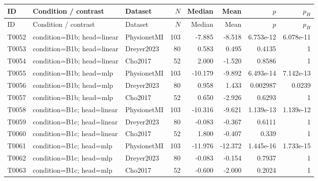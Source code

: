 \begin{longtable}{p{.45in}p{2.6in}p{.75in}rrrrr}
\toprule
ID & Condition / contrast & Dataset & $N$ & Median & Mean & $p$ & $p_H$ \\
\midrule
\endfirsthead
\toprule
ID & Condition / contrast & Dataset & $N$ & Median & Mean & $p$ & $p_H$ \\
\midrule
\endhead
T0052 & condition=B1b; head=linear & PhysionetMI & 103 & -7.885 & -8.518 & 6.753e-12 & 6.078e-11 \\
T0053 & condition=B1b; head=linear & Dreyer2023 & 80 & 0.583 & 0.495 & 0.4135 & 1 \\
T0054 & condition=B1b; head=linear & Cho2017 & 52 & 2.000 & -1.520 & 0.8586 & 1 \\
T0055 & condition=B1b; head=mlp & PhysionetMI & 103 & -10.179 & -9.892 & 6.493e-14 & 7.142e-13 \\
T0056 & condition=B1b; head=mlp & Dreyer2023 & 80 & 0.958 & 1.433 & 0.002987 & 0.0239 \\
T0057 & condition=B1b; head=mlp & Cho2017 & 52 & 0.650 & -2.926 & 0.6293 & 1 \\
T0058 & condition=B1c; head=linear & PhysionetMI & 103 & -10.316 & -9.621 & 1.139e-13 & 1.139e-12 \\
T0059 & condition=B1c; head=linear & Dreyer2023 & 80 & -0.083 & -0.367 & 0.6111 & 1 \\
T0060 & condition=B1c; head=linear & Cho2017 & 52 & 1.800 & -0.407 & 0.339 & 1 \\
T0061 & condition=B1c; head=mlp & PhysionetMI & 103 & -11.976 & -12.372 & 1.445e-16 & 1.733e-15 \\
T0062 & condition=B1c; head=mlp & Dreyer2023 & 80 & -0.083 & -0.154 & 0.7937 & 1 \\
T0063 & condition=B1c; head=mlp & Cho2017 & 52 & -0.600 & -2.000 & 0.2024 & 1 \\
\bottomrule
\end{longtable}
